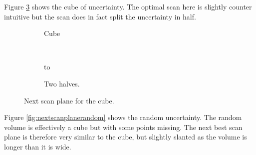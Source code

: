 Figure \ref{fig:nextscanplanecube} shows the cube of uncertainty. The optimal scan here is slightly counter intuitive but the scan does in fact split the uncertainty in half.

\begin{figure}[H]
  \centering
  \begin{subfigure}[b]{0.4\textwidth}
    \usebox{\mybox}
    \caption{Cube}
    \label{fig:nextscanplanecube}  
  \end{subfigure}%
  ~ %
  \begin{subfigure}[b]{0.4\textwidth}
    \vbox to \ht{}
    \caption{Two halves.}
    \label{fig:nextscanplanecubecut}  
  \end{subfigure}  
  \caption{Next scan plane for the cube.}\label{fig:nextscanplanecube}
\end{figure}

Figure \ref{fig:nextscanplanerandom} shows the random uncertainty. The random volume is effectively a cube but with some points missing. The next best scan plane is therefore very similar to the cube, but slightly slanted as the volume is longer than it is wide.

